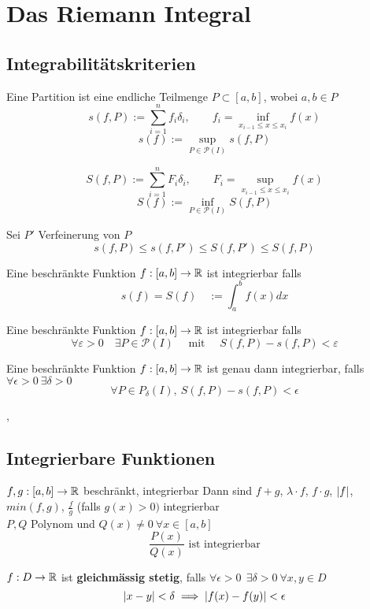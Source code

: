 \section{Das Riemann Integral}

\subsection{Integrabilitätskriterien}

\Def[5.1.1] Eine Partition ist eine endliche Teilmenge $P \subset [a, b]$, wobei $a,b \in P$ \\

\Def[Untersumme]
\[s(f, P):=\sum_{i=1}^{n} f_{i} \delta_{i}, \quad \quad f_i = \inf_{x_{i-1}\leq x \leq x_i} f(x)\]
\[s(f):=\sup_{P \in \mathcal{P}(I)} s(f, P) \] 

\Def[Obersumme]
\[S(f, P):=\sum_{i=1}^{n} F_{i} \delta_{i}, \quad \quad F_i = \sup_{x_{i-1}\leq x \leq x_i} f(x)\]
\[S(f):=\inf_{P \in \mathcal{P}(I)} S(f, P) \] 


\Lemma[5.1.2] Sei $P'$ Verfeinerung von $P$
\[s(f, P) \leq s(f, P') \leq S(f, P') \leq S(f, P) \] 


\Def [5.1.3] Eine beschränkte Funktion $f : [a,b] \rightarrow \mathbb{R}$ ist integrierbar falls
\[s(f) = S(f) \quad := \int_{a}^{b} f(x) dx \] 

\Satz [5.1.4] Eine beschränkte Funktion $f : [a,b] \rightarrow \mathbb{R}$ ist integrierbar falls
\[\forall \varepsilon>0 \quad \exists P \in \mathcal{P}(I) \quad \text { mit } \quad S(f, P)-s(f, P)<\varepsilon\]

\Satz[5.1.8] Eine beschränkte Funktion $f: [a, b] \rightarrow \mathbb{R}$ ist genau dann integrierbar, falls $\forall \epsilon > 0 \ \exists \delta > 0$
\[ \forall P \in P_\delta (I), \ S(f, P) - s(f, P) < \epsilon \]

\sep 

\subsection{Integrierbare Funktionen}

\Satz[5.2.1] $f, g : [a,b] \rightarrow \mathbb{R}$ beschränkt, integrierbar
Dann sind $f + g$, $\lambda \cdot f$, $f \cdot g$, $\left\lvert f \right\rvert$, $min(f, g)$, $ \frac{f}{g}$ (falls $g(x) > 0)$ integrierbar \\

\Korollar[5.2.3] $P, Q$ Polynom und $Q(x) \neq 0 \ \forall x \in [a,b]$
\[ \frac{P(x)}{Q(x)} \text{ ist integrierbar} \]

\Satz[5.2.4] $f: D \rightarrow \mathbb{R}$ ist \textbf{gleichmässig stetig}, falls $ \forall \epsilon > 0 \ \ \exists \delta > 0 \ \forall x, y \in D$
\[  \left\lvert x - y \right\rvert < \delta \implies \left\lvert f(x) - f(y) \right\rvert < \epsilon \]

